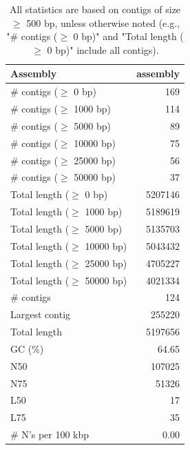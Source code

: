 \documentclass[12pt,a4paper]{article}
\begin{document}
\begin{table}[ht]
\begin{center}
\caption{All statistics are based on contigs of size $\geq$ 500 bp, unless otherwise noted (e.g., "\# contigs ($\geq$ 0 bp)" and "Total length ($\geq$ 0 bp)" include all contigs).}
\begin{tabular}{|l*{1}{|r}|}
\hline
Assembly & assembly \\ \hline
\# contigs ($\geq$ 0 bp) & 169 \\ \hline
\# contigs ($\geq$ 1000 bp) & 114 \\ \hline
\# contigs ($\geq$ 5000 bp) & 89 \\ \hline
\# contigs ($\geq$ 10000 bp) & 75 \\ \hline
\# contigs ($\geq$ 25000 bp) & 56 \\ \hline
\# contigs ($\geq$ 50000 bp) & 37 \\ \hline
Total length ($\geq$ 0 bp) & 5207146 \\ \hline
Total length ($\geq$ 1000 bp) & 5189619 \\ \hline
Total length ($\geq$ 5000 bp) & 5135703 \\ \hline
Total length ($\geq$ 10000 bp) & 5043432 \\ \hline
Total length ($\geq$ 25000 bp) & 4705227 \\ \hline
Total length ($\geq$ 50000 bp) & 4021334 \\ \hline
\# contigs & 124 \\ \hline
Largest contig & 255220 \\ \hline
Total length & 5197656 \\ \hline
GC (\%) & 64.65 \\ \hline
N50 & 107025 \\ \hline
N75 & 51326 \\ \hline
L50 & 17 \\ \hline
L75 & 35 \\ \hline
\# N's per 100 kbp & 0.00 \\ \hline
\end{tabular}
\end{center}
\end{table}
\end{document}
